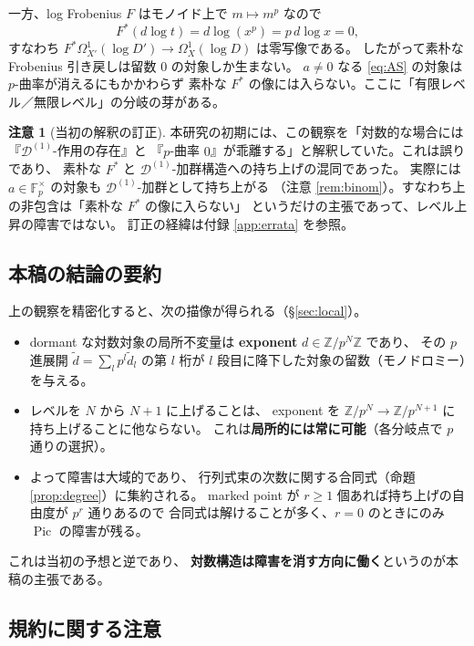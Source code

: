 \documentclass[a4paper,11pt]{ltjsarticle}
\theoremstyle{plain}
\theoremstyle{definition}
\newtheorem{remark}[theorem]{注意}
\newcommand{\bbZ}{\mathbb{Z}}
\newcommand{\bbF}{\mathbb{F}}
\newcommand{\cD}{\mathcal{D}}
\newcommand{\Pic}{\operatorname{Pic}}
\newcommand{\dlog}{d\!\log}
\begin{document}
一方、log Frobenius $F$ はモノイド上で $m\mapsto m^p$ なので
\[
  F^*(\dlog t)=\dlog(x^p)=p\,\dlog x=0 ,
\]
すなわち $F^*\Omega^1_{X'}(\log D')\to\Omega^1_X(\log D)$ は零写像である。
したがって素朴な Frobenius 引き戻しは留数 $0$ の対象しか生まない。
$a\neq0$ なる \eqref{eq:AS} の対象は $p$-曲率が消えるにもかかわらず
素朴な $F^*$ の像には入らない。ここに「有限レベル／無限レベル」の分岐の芽がある。

\begin{remark}[当初の解釈の訂正]\label{rem:early-misread}
本研究の初期には、この観察を「対数的な場合には『$\cD^{(1)}$-作用の存在』と
『$p$-曲率 $0$』が乖離する」と解釈していた。これは誤りであり、
素朴な $F^*$ と $\cD^{(1)}$-加群構造への持ち上げの混同であった。
実際には $a\in\bbF_p^\times$ の対象も $\cD^{(1)}$-加群として持ち上がる
（注意 \ref{rem:binom}）。すなわち上の非包含は「素朴な $F^*$ の像に入らない」
というだけの主張であって、レベル上昇の障害ではない。
訂正の経緯は付録 \ref{app:errata} を参照。
\end{remark}

\subsection{本稿の結論の要約}

上の観察を精密化すると、次の描像が得られる（\S\ref{sec:local}）。
\begin{itemize}[leftmargin=1.6em]
\item dormant な対数対象の局所不変量は
      \textbf{exponent} $d\in\bbZ/p^{N}\bbZ$ であり、
      その $p$ 進展開 $\tilde d=\sum_{l}p^l\tilde d_l$ の第 $l$ 桁が
      $l$ 段目に降下した対象の留数（モノドロミー）を与える。
\item レベルを $N$ から $N+1$ に上げることは、
      exponent を $\bbZ/p^{N}\to\bbZ/p^{N+1}$ に持ち上げることに他ならない。
      これは\textbf{局所的には常に可能}（各分岐点で $p$ 通りの選択）。
\item よって障害は大域的であり、
      行列式束の次数に関する合同式（命題 \ref{prop:degree}）に集約される。
      marked point が $r\ge1$ 個あれば持ち上げの自由度が $p^r$ 通りあるので
      合同式は解けることが多く、$r=0$ のときにのみ $\Pic$ の障害が残る。
\end{itemize}
これは当初の予想と逆であり、
\textbf{対数構造は障害を消す方向に働く}というのが本稿の主張である。

\subsection{規約に関する注意}\label{ss:convention}
\end{document}

